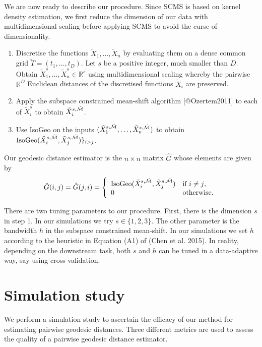 We are now ready to describe our procedure. Since SCMS is based on
kernel density estimation, we first reduce the dimension of our data
with multidimensional scaling before applying SCMS to avoid the curse of
dimensionality.

\begin{enumerate}
\item Discretise the functions $\tilde X_1,\ldots,\tilde X_n$ by evaluating them on a dense common grid $\tilde T=(t_{1},\ldots,t_{D})$. Let $s$ be a positive integer, much smaller than $D$. Obtain $\tilde X^s_1,\ldots,\tilde X^s_n \in \mathbb R^s$ using multidimensional scaling whereby the pairwise $\mathbb R^D$ Euclidean distances of the discretised functions $\tilde X_i$ are preserved.
\item Apply the subspace constrained mean-shift algorithm [@Ozertem2011] to each of $\tilde X^s_i$ to obtain $\tilde X^{s,\hat {\mathcal{M}}}_i$.
\item Use IsoGeo on the inputs $(\tilde X^{s,\hat {\mathcal{M}}}_1,\ldots,\tilde X^{s,\hat {\mathcal{M}}}_n)$ to obtain $\text{IsoGeo}(\tilde X^{s,\hat {\mathcal{M}}}_i,\tilde X^{s,\hat {\mathcal{M}}}_j)\}_{i>j}$.
\end{enumerate}

Our geodesic distance estimator is the \(n{\times}n\) matrix \(\hat G\)
whose elements are given by \[
\hat G(i,j)=\hat G(j,i) = \left\{ \begin{array}{ll}
 \text{IsoGeo}(\tilde X^{s,\hat {\mathcal{M}}}_i,\tilde X^{s,\hat {\mathcal{M}}}_j) & \textrm{if $i\neq j$,}\\
 0 & \textrm{otherwise.}
  \end{array} \right.
\]

There are two tuning parameters to our procedure. First, there is the
dimension \(s\) in step 1. In our simulations we try
\(s \in \{1,2,3\}\). The other parameter is the bandwidth \(h\) in the
subspace constrained mean-shift. In our simulations we set \(h\)
according to the heuristic in Equation (A1) of (Chen et al. 2015). In
reality, depending on the downstream task, both \(s\) and \(h\) can be
tuned in a data-adaptive way, say using cross-validation.

\section{Simulation study}\label{simulation-study}

We perform a simulation study to ascertain the efficacy of our method
for estimating pairwise geodesic distances. Three different metrics are
used to assess the quality of a pairwise geodesic distance estimator.

